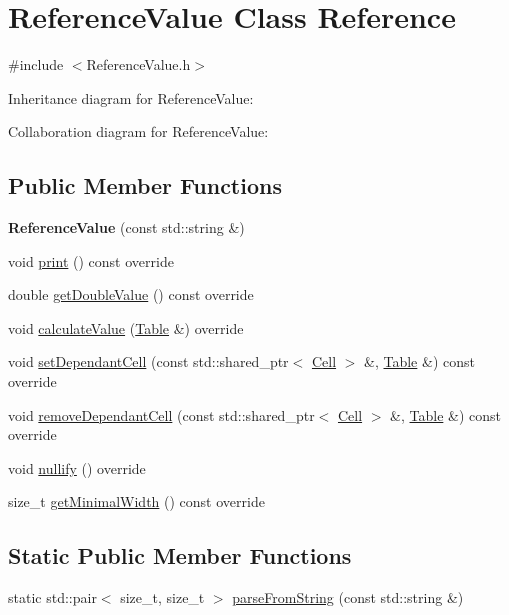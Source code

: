 \hypertarget{classReferenceValue}{}\section{Reference\+Value Class Reference}
\label{classReferenceValue}


{\ttfamily \#include $<$Reference\+Value.\+h$>$}



Inheritance diagram for Reference\+Value\+:


Collaboration diagram for Reference\+Value\+:
\subsection*{Public Member Functions}
\begin{DoxyCompactItemize}
\item 
\mbox{\label{classReferenceValue_ae0a48f7dc231764b8a75946543fb8754}} 
{\bfseries Reference\+Value} (const std\+::string \&)
\item 
void \hyperlink{classReferenceValue_a24850974f891910d5f9298db29239e1e}{print} () const override
\item 
double \hyperlink{classReferenceValue_a1628a2c88bc97597b9f7e4f5b7a7a834}{get\+Double\+Value} () const override
\item 
void \hyperlink{classReferenceValue_a854b3c1368ad878010dd930307f9ccd2}{calculate\+Value} (\hyperlink{classTable}{Table} \&) override
\item 
void \hyperlink{classReferenceValue_a28ae7e6bd74fa18735456be37c866804}{set\+Dependant\+Cell} (const std\+::shared\+\_\+ptr$<$ \hyperlink{classCell}{Cell} $>$ \&, \hyperlink{classTable}{Table} \&) const override
\item 
void \hyperlink{classReferenceValue_a8cfd2b3e5f8d18b50ab523e7f9c8ad02}{remove\+Dependant\+Cell} (const std\+::shared\+\_\+ptr$<$ \hyperlink{classCell}{Cell} $>$ \&, \hyperlink{classTable}{Table} \&) const override
\item 
void \hyperlink{classReferenceValue_ad8d2f9ed510ea8d0c5076089dd52c998}{nullify} () override
\item 
size\+\_\+t \hyperlink{classReferenceValue_a5d4898e7695e098c1e6b26dfdcddbac2}{get\+Minimal\+Width} () const override
\end{DoxyCompactItemize}
\subsection*{Static Public Member Functions}
\begin{DoxyCompactItemize}
\item 
static std\+::pair$<$ size\+\_\+t, size\+\_\+t $>$ \hyperlink{classReferenceValue_ac8f0e1ec9b046692e551fc509e71d150}{parse\+From\+String} (const std\+::string \&)
\end{DoxyCompactItemize}


